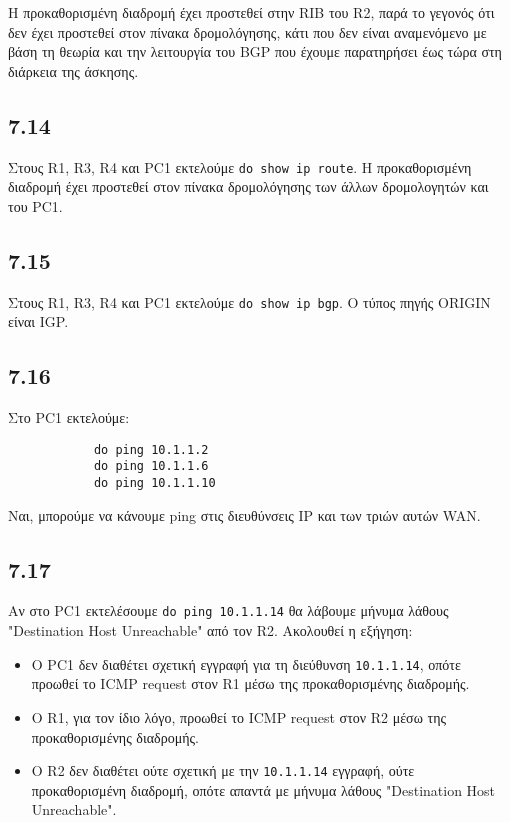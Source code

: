 \documentclass[a4paper, 12pt]{article}
\begin{document}
		Η προκαθορισμένη διαδρομή έχει προστεθεί στην RIB του R2, παρά το γεγονός ότι δεν έχει προστεθεί στον πίνακα δρομολόγησης, κάτι που δεν είναι αναμενόμενο με βάση τη θεωρία και την λειτουργία του BGP που έχουμε παρατηρήσει έως τώρα στη διάρκεια της άσκησης.

	\subsection*{7.14}
		Στους R1, R3, R4 και PC1 εκτελούμε \verb|do show ip route|. Η προκαθορισμένη διαδρομή έχει προστεθεί στον πίνακα δρομολόγησης των άλλων δρομολογητών και του PC1.
	
	\subsection*{7.15}
		Στους R1, R3, R4 και PC1 εκτελούμε \verb|do show ip bgp|. Ο τύπος πηγής ORIGIN είναι IGP.

	\subsection*{7.16}
		Στο PC1 εκτελούμε:
		
		\begin{verbatim}
			do ping 10.1.1.2
			do ping 10.1.1.6
			do ping 10.1.1.10
		\end{verbatim}

		Ναι, μπορούμε να κάνουμε ping στις διευθύνσεις IP και των τριών αυτών WAN.

	\subsection*{7.17}
		Αν στο PC1 εκτελέσουμε \verb|do ping 10.1.1.14| θα λάβουμε μήνυμα λάθους "Destination Host Unreachable" από τον R2. Ακολουθεί η εξήγηση:
		
		\begin{itemize}
			\item Ο PC1 δεν διαθέτει σχετική εγγραφή για τη διεύθυνση \verb|10.1.1.14|, οπότε προωθεί το ICMP request στον R1 μέσω της προκαθορισμένης διαδρομής.
			\item Ο R1, για τον ίδιο λόγο, προωθεί το ICMP request στον R2 μέσω της προκαθορισμένης διαδρομής.
			\item Ο R2 δεν διαθέτει ούτε σχετική με την \verb|10.1.1.14| εγγραφή, ούτε προκαθορισμένη διαδρομή, οπότε απαντά με μήνυμα λάθους "Destination Host Unreachable".
		\end{itemize}
\end{document}
